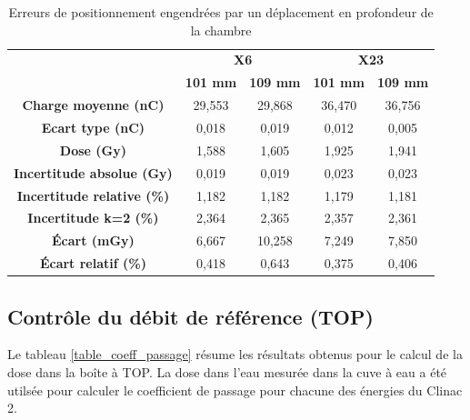 \documentclass{article}
\begin{document}
\begin{table}[h]
  \centering
  \begin{tabular}{c|cc|cc|}
  \cline{2-5}
  \textbf{} & \multicolumn{2}{c|}{\textbf{X6}} & \multicolumn{2}{c|}{\textbf{X23}} \\ \cline{2-5} 
  \textbf{} & \textbf{101 mm} & \textbf{109 mm} & \textbf{101 mm} & \textbf{109 mm} \\ \hline
  \multicolumn{1}{|c|}{\textbf{Charge moyenne   (nC)}} & 29,553 & 29,868 & 36,470 & 36,756 \\
  \multicolumn{1}{|c|}{\textbf{Ecart type (nC)}} & 0,018 & 0,019 & 0,012 & 0,005 \\
  \multicolumn{1}{|c|}{\textbf{Dose (Gy)}} & 1,588 & 1,605 & 1,925 & 1,941 \\
  \multicolumn{1}{|c|}{\textbf{Incertitude absolue (Gy)}} & 0,019 & 0,019 & 0,023 & 0,023 \\
  \multicolumn{1}{|c|}{\textbf{Incertitude relative (\%)}} & 1,182 & 1,182 & 1,179 & 1,181 \\
  \multicolumn{1}{|c|}{\textbf{Incertitude k=2 (\%)}} & 2,364 & 2,365 & 2,357 & 2,361 \\
  \multicolumn{1}{|c|}{\textbf{Écart (mGy)}} & 6,667 & 10,258 & 7,249 & 7,850 \\
  \multicolumn{1}{|c|}{\textbf{Écart relatif (\%)}} & 0,418 & 0,643 & 0,375 & 0,406 \\ \hline
  \end{tabular}
  \caption{Erreurs de positionnement engendrées par un déplacement en profondeur de la chambre}
  \label{table_erreur_profondeur}
\end{table}

\newpage
\subsection{Contrôle du débit de référence (TOP)}

Le tableau \ref*{table_coeff_passage} résume les résultats obtenus pour le calcul de la dose dans la boîte à TOP. La dose dans l'eau mesurée dans la cuve à eau a été utilsée pour calculer le coefficient de passage pour chacune des énergies du Clinac 2. 
\end{document}
